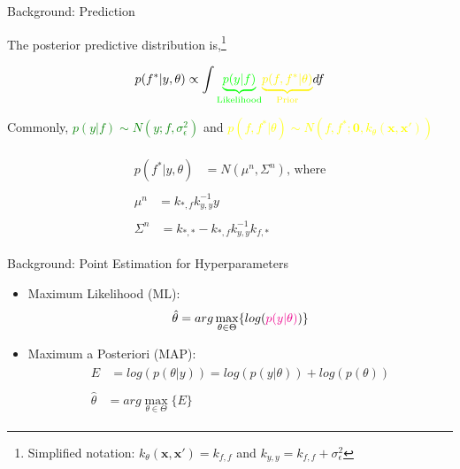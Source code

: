 \documentclass{beamer}
\begin{document}
\begin{frame}{Background: Prediction}

The posterior predictive distribution is,\footnote{Simplified notation:  $k_{\theta}(\mathbf{x},\mathbf{x'}) = k_{f,f}$ and $k_{y,y} = k_{f,f} + \sigma^{2}_{\epsilon}$}

$$p(f^{*}|y,\theta)  \propto \int \textcolor{green}{\underbrace{p(y|f)}_\text{Likelihood}} \textcolor{yellow}{\underbrace{p(f,f^{*}|\theta)}_\text{Prior}} df$$

Commonly, \textcolor{green}{$p(y|f) \sim N(y; f , \sigma^{2}_{\epsilon})$} and \textcolor{yellow}{$p(f,f^{*}|\theta) \sim N(f,f^{*}; \mathbf{0} , k_{\theta}(\mathbf{x},\mathbf{x'}))$}


\begin{align*}
\begin{split}
p(f^{*}|y,\theta) &= N(\mu^{n},\Sigma^{n}) \text{, where} 
\end{split}\\
\begin{split}
\mu^{n} &= k_{*,f}k^{-1}_{y,y}y
\end{split}\\
\begin{split}
\Sigma^{n} &= k_{*,*} - k_{*,f}k_{y,y}^{-1}k_{f,*}
\end{split}
\end{align*}

\end{frame}
\begin{frame}{Background: Point Estimation for Hyperparameters}

\begin{itemize}
	\item Maximum Likelihood (ML):
	\begin{align*}
	\begin{split}
	\hat{\theta}= arg \max_{\theta \in \Theta} \{log(\textcolor{magenta}{p(y|\theta)}) \}
	\end{split}
	\end{align*}
	
	\item Maximum a Posteriori (MAP):
	\begin{align*}
	\begin{split}
	E &= log(p(\theta|y)) = log(p(y|\theta)) + log(p(\theta))
	\end{split}\\
	\begin{split}
	\hat{\theta} &= arg \max_{\theta \in \Theta}\{E\}  
	\end{split}
	\end{align*}
\end{itemize}


\end{frame}
\end{document}
